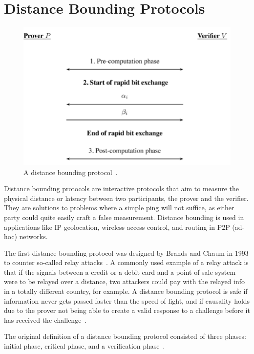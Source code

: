 \section{Distance Bounding Protocols}
\begin{figure}
  \includegraphics[width=\textwidth]{pictures/distance_bounding.png}
  \caption{A distance bounding protocol~\cite{Peeters2011-bd}.}
  \label{Distance Bounding Protocol}
\end{figure}
Distance bounding protocols are interactive protocols that aim to measure the physical distance or latency between two participants, the prover and the verifier. They are solutions to problems where a simple ping will not suffice, as either party could quite easily craft a false measurement. Distance bounding is used in applications like IP geolocation, wireless access control, and routing in P2P (ad-hoc) networks.

The first distance bounding protocol was designed by Brands and Chaum in 1993 to counter so-called relay attacks~\cite{Boureanu_undated-bn, Brands1994-hz}. A commonly used example of a relay attack is that if the signals between a credit or a debit card and a point of sale system were to be relayed over a distance, two attackers could pay with the relayed info in a totally different country, for example. A distance bounding protocol is safe if information never gets passed faster than the speed of light, and if causality holds due to the prover not being able to create a valid response to a challenge before it has received the challenge~\cite{Boureanu2014-bn}.

The original definition of a distance bounding protocol consisted of three phases: initial phase, critical phase, and a verification phase~\cite{Brands1994-hz, Mauw2018-uz}.

